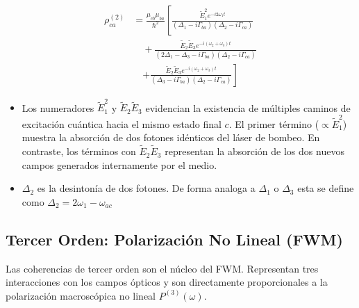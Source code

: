 \documentclass[12pt,a4paper]{article}
\begin{document}
\begin{equation}
\begin{aligned}
\rho_{ca}^{(2)} &= \frac{\mu_{cb}\mu_{ba}}{\hbar^2} \left[ \frac{\tilde{E}_1^2 e^{-i2\omega_1 t}}{(\Delta_1 - i\Gamma_{ba})(\Delta_2 - i\Gamma_{ca})} \right. \\
&\quad + \frac{\tilde{E}_2\tilde{E}_3 e^{-i(\omega_2+\omega_3)t}}{(2\Delta_1 - \Delta_3 - i\Gamma_{ba})(\Delta_2 - i\Gamma_{ca})} \\
&\quad \left. + \frac{\tilde{E}_2\tilde{E}_3 e^{-i(\omega_2+\omega_3)t}}{(\Delta_3 - i\Gamma_{ba})(\Delta_2 - i\Gamma_{ca})} \right]
\end{aligned} \tag{3}
\end{equation}

\begin{itemize} 
    \item Los numeradores $\tilde{E}_1^2$ y $\tilde{E}_2\tilde{E}_3$ evidencian la existencia de múltiples caminos de excitación cuántica hacia el mismo estado final $c$. El primer término ($\propto \tilde{E}_1^2$) muestra la absorción de dos fotones idénticos del láser de bombeo. En contraste, los términos con $\tilde{E}_2\tilde{E}_3$ representan la absorción de los dos nuevos campos generados internamente por el medio.
    
    \item $\Delta_2$ es la desintonía de dos fotones. De forma analoga a $\Delta_1$ o $\Delta_3$ esta se define como $\Delta_2 = 2\omega_1 - \omega_{ac} $

\end{itemize}

\subsection*{Tercer Orden: Polarización No Lineal (FWM)}
Las coherencias de tercer orden son el núcleo del FWM. Representan tres interacciones con los campos ópticos y son directamente proporcionales a la polarización macroscópica no lineal $P^{(3)}(\omega)$.
\end{document}
